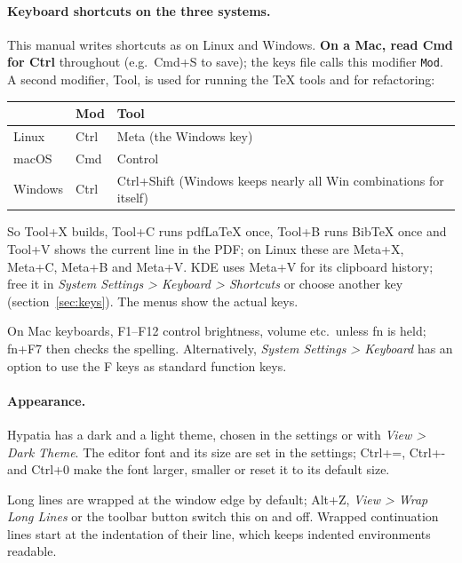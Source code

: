 \documentclass[11pt]{article}
\newcommand{\key}[1]{\textsf{#1}}
\newcommand{\menu}[1]{\textsf{\textit{#1}}}
\begin{document}
    \paragraph{Keyboard shortcuts on the three systems.}\label{sec:keynotation}     This manual writes shortcuts as on Linux and Windows. \textbf{On a Mac, read Cmd for Ctrl} throughout (e.g.\ \key{Cmd+S} to save); the keys file calls this modifier \verb+Mod+. A second modifier, \key{Tool}, is used for running the TeX tools and for refactoring:
    \begin{center}
        \begin{tabular}{lll}
            & \key{Mod} & \key{Tool}\\\hline
            Linux & \key{Ctrl} & \key{Meta} (the Windows key)\\
            macOS & \key{Cmd} & \key{Control}\\
            Windows & \key{Ctrl} & \key{Ctrl+Shift} (Windows keeps nearly all \key{Win} combinations for itself)
        \end{tabular}
    \end{center}
    So \key{Tool+X} builds, \key{Tool+C} runs pdf\LaTeX{} once, \key{Tool+B} runs Bib\TeX{} once and \key{Tool+V} shows the current line in the PDF; on Linux these are \key{Meta+X}, \key{Meta+C}, \key{Meta+B} and \key{Meta+V}. KDE uses \key{Meta+V} for its clipboard history; free it in \menu{System Settings > Keyboard > Shortcuts} or choose another key (section~\ref{sec:keys}). The menus show the actual keys.

    On Mac keyboards, \key{F1}--\key{F12} control brightness, volume etc.\ unless \key{fn} is held; \key{fn+F7} then checks the spelling. Alternatively, \menu{System Settings > Keyboard} has an option to use the F keys as standard function keys.

    \paragraph{Appearance.}     Hypatia has a dark and a light theme, chosen in the settings or with \menu{View > Dark Theme}. The editor font and its size are set in the settings; \key{Ctrl+=}, \key{Ctrl+-} and \key{Ctrl+0} make the font larger, smaller or reset it to its default size.

    Long lines are wrapped at the window edge by default; \key{Alt+Z}, \menu{View > Wrap Long Lines} or the toolbar button switch this on and off. Wrapped continuation lines start at the indentation of their line, which keeps indented environments readable.
\end{document}
